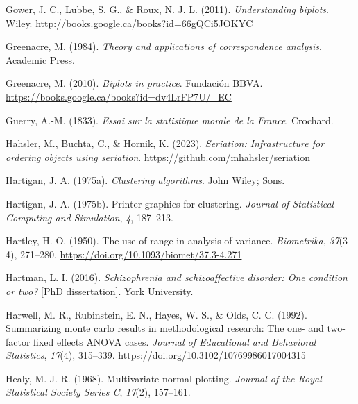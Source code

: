 \documentclass[
  letterpaper,
  10pt,
  krantz2]{krantz}
\newlength{\cslhangindent}
\newlength{\cslentryspacingunit} %
\newenvironment{CSLReferences}[2] %
 {%
  \setlength{\parindent}{0pt}
  \ifodd #1
  \let\oldpar\par
  \def\par{\hangindent=\cslhangindent\oldpar}
  \fi
  \setlength{\parskip}{#2\cslentryspacingunit}
 }%
 {}
\begin{document}
\begin{CSLReferences}{1}{0}
\leavevmode{}%
Gower, J. C., Lubbe, S. G., \& Roux, N. J. L. (2011).
\emph{Understanding biplots}. Wiley.
\url{http://books.google.ca/books?id=66gQCi5JOKYC}

\leavevmode{}%
Greenacre, M. (1984). \emph{Theory and applications of correspondence
analysis}. Academic Press.

\leavevmode{}%
Greenacre, M. (2010). \emph{Biplots in practice}. Fundaci{ó}n BBVA.
\url{https://books.google.ca/books?id=dv4LrFP7U/_EC}

\leavevmode{}%
Guerry, A.-M. (1833). \emph{Essai sur la statistique morale de la
{France}}. Crochard.

\leavevmode{}%
Hahsler, M., Buchta, C., \& Hornik, K. (2023). \emph{Seriation:
Infrastructure for ordering objects using seriation}.
\url{https://github.com/mhahsler/seriation}

\leavevmode{}%
Hartigan, J. A. (1975a). \emph{Clustering algorithms}. John Wiley; Sons.

\leavevmode{}%
Hartigan, J. A. (1975b). Printer graphics for clustering. \emph{Journal
of Statistical Computing and Simulation}, \emph{4}, 187--213.

\leavevmode{}%
Hartley, H. O. (1950). The use of range in analysis of variance.
\emph{Biometrika}, \emph{37}(3--4), 271--280.
\url{https://doi.org/10.1093/biomet/37.3-4.271}

\leavevmode{}%
Hartman, L. I. (2016). \emph{Schizophrenia and schizoaffective disorder:
One condition or two?} {[}PhD dissertation{]}. York University.

\leavevmode{}%
Harwell, M. R., Rubinstein, E. N., Hayes, W. S., \& Olds, C. C. (1992).
Summarizing monte carlo results in methodological research: The one- and
two-factor fixed effects {ANOVA} cases. \emph{Journal of Educational and
Behavioral Statistics}, \emph{17}(4), 315--339.
\url{https://doi.org/10.3102/10769986017004315}

\leavevmode{}%
Healy, M. J. R. (1968). Multivariate normal plotting. \emph{Journal of
the Royal Statistical Society Series C}, \emph{17}(2), 157--161.


\end{CSLReferences}
\end{document}
